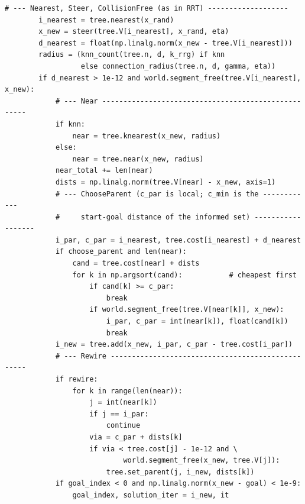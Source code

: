\begin{lstlisting}[caption={One iteration of \rrtstar (from \code{code/ch17\_rrt\_star.py}): \textsc{Nearest}, \textsc{Steer} and the collision check as in \rrt, then \textsc{Near}, \textsc{ChooseParent} with the candidates sorted by cost, and \textsc{Rewire} with the improvement test before the segment check. \code{tree.set\_parent} propagates the new cost to the subtree; \code{radius} is $r_n$ or $k_n$.},label={lst:ch17-core}]
        # --- Nearest, Steer, CollisionFree (as in RRT) -------------------
        i_nearest = tree.nearest(x_rand)
        x_new = steer(tree.V[i_nearest], x_rand, eta)
        d_nearest = float(np.linalg.norm(x_new - tree.V[i_nearest]))
        radius = (knn_count(tree.n, d, k_rrg) if knn
                  else connection_radius(tree.n, d, gamma, eta))
        if d_nearest > 1e-12 and world.segment_free(tree.V[i_nearest], x_new):
            # --- Near ----------------------------------------------------
            if knn:
                near = tree.knearest(x_new, radius)
            else:
                near = tree.near(x_new, radius)
            near_total += len(near)
            dists = np.linalg.norm(tree.V[near] - x_new, axis=1)
            # --- ChooseParent (c_par is local; c_min is the ------------
            #     start-goal distance of the informed set) ------------------
            i_par, c_par = i_nearest, tree.cost[i_nearest] + d_nearest
            if choose_parent and len(near):
                cand = tree.cost[near] + dists
                for k in np.argsort(cand):           # cheapest first
                    if cand[k] >= c_par:
                        break
                    if world.segment_free(tree.V[near[k]], x_new):
                        i_par, c_par = int(near[k]), float(cand[k])
                        break
            i_new = tree.add(x_new, i_par, c_par - tree.cost[i_par])
            # --- Rewire --------------------------------------------------
            if rewire:
                for k in range(len(near)):
                    j = int(near[k])
                    if j == i_par:
                        continue
                    via = c_par + dists[k]
                    if via < tree.cost[j] - 1e-12 and \
                            world.segment_free(x_new, tree.V[j]):
                        tree.set_parent(j, i_new, dists[k])
            if goal_index < 0 and np.linalg.norm(x_new - goal) < 1e-9:
                goal_index, solution_iter = i_new, it
\end{lstlisting}


